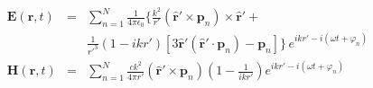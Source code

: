 \documentclass[preview]{standalone}
\begin{document}
\pagecolor[RGB]{255,255,255} %

\begin{eqnarray*}
  \mathbf{E}(\mathbf{r}, t) & = &
                                  \sum_{n=1}^{N}\frac{1}{4\pi\epsilon_{0}} \Big\{\frac{k^{2}}{{r}'}(\mathbf{\hat{r}'} \times \mathbf{p}_{n}) \times \mathbf{\hat{r}'} +\\
                            && \frac{1}{{r'}^{3}}(1-ikr') \left[ 3\mathbf{\hat{r}'}(\mathbf{\hat{r}'} \cdot \mathbf{p}_{n}) - \mathbf{p}_{n}\right] \Big\}\,e^{ikr' - i(\omega t + \varphi_{n})} \\
  \mathbf{H}(\mathbf{r}, t) & = & \sum_{n=1}^{N}\frac{ck^{2}}{4\pi r'} (\mathbf{\hat{r}'} \times \mathbf{p}_{n}) \left (1 - \frac{1}{ikr'}\right) e^{ikr' - i(\omega t + \varphi_{n})} \\
\end{eqnarray*}
\end{document}
